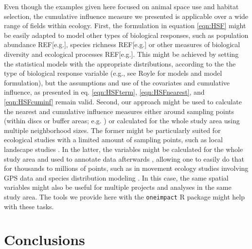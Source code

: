 \documentclass[titlepage]{article}
\begin{document}
Even though the examples given here focused on animal space use and habitat selection, the cumulative influence measure we presented is applicable over a wide range
of fields within ecology. First, the formulation in equation \ref{eqn:HSF} might be easily adapted to model other types of biological responses, such as population abundance REF[e.g.],
species richness REF[e.g.] or other measures of biological diversity and ecological processes REF[e.g.]. This might be achieved by setting the statistical models with the appropriate distributions, according to the the type of biological response variable (e.g., see Royle for models and model formulation), but the assumptions and use of the covariates and cumulative influence, as presented in eq. \ref{eqn:HSFterm}, \ref{eqn:HSFnearest}, and \ref{eqn:HSFcuminf} remain valid. Second, our approach might be used to calculate the nearest and cumulative influence measures either around sampling points (within discs or buffer areas; e.g. \citealt{huais_multifit_2018}) or calculated for the whole study area using multiple neighborhood sizes. The former might be particularly suited for ecological studies with a limited amount of sampling points, such as local landscape studies \citep[e.g.][]{muylaert_threshold_2016}. In the latter, the variables might be calculated for the whole study area and used to annotate data afterwards \citealp[e.g.][]{zeller_multi-level_2017}, allowing one to easily do that for thousands to millions of points, such as in movement ecology studies involving GPS data \citep[e.g.][]{tucker_moving_2018, davidson_ecological_2020} and species distribution modeling \citep{panzacchi_searching_2015}. In this case, the same spatial variables might also be useful for multiple projects and analyses in the same study area. The tools we provide here with the \verb|oneimpact| R package might help with these tasks.

\section{Conclusions}
\end{document}
